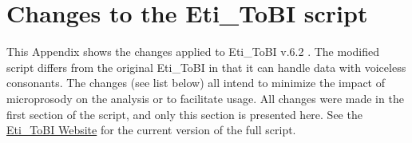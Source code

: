 
\chapter{Changes to the Eti\_ToBI script}

\label{app:AppendixB} %

This Appendix shows the changes applied to Eti\_ToBI v.6.2 \citep{ElviraGarciaRoseanoFernandezPlanas.2016}. The modified script differs from the original Eti\_ToBI in that it can handle data with voiceless consonants. The changes (see list below) all intend to minimize the impact of microprosody on the analysis or to facilitate usage. All changes were made in the first section of the script, and only this section is presented here. See the \href{http://stel3.ub.edu/labfon/amper/eti_ToBI/}{Eti\_ToBI Website} for the current version of the full script.\largerpage


